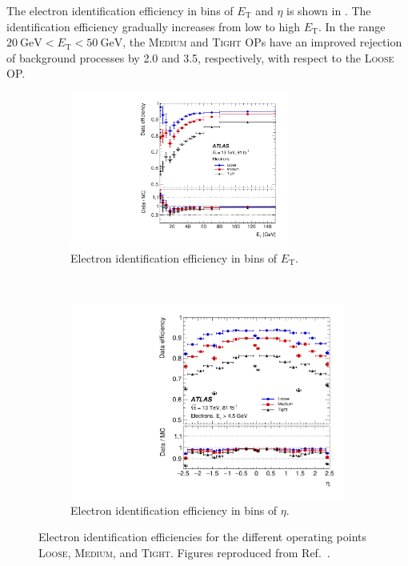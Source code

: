 The electron identification efficiency in bins of \(E_{\text{T}}\) and \(\eta\) is shown in . The identification efficiency gradually increases from low to high \(E_{\text{T}}\). In the range \(\SI{20}{\giga\electronvolt} < E_{\text{T}} < \SI{50}{\giga\electronvolt}\), the \textsc{Medium} and \textsc{Tight} OPs have an improved rejection of background processes by \num{2.0} and \num{3.5}, respectively, with respect to the \textsc{Loose} OP.
\begin{figure}[htbp]
    \centering
    \begin{subfigure}{1.\textwidth}
      \centering
      \includegraphics[width=0.79\textwidth]{figures/methods/electron_id_et.pdf}
      \caption{Electron identification efficiency in bins of \(E_{\text{T}}\).}
      \label{fig:methods:event-reconstruction:electrons:identification:et}
    \end{subfigure}
    \\
    \begin{subfigure}{1.\textwidth}
      \centering
      \includegraphics[width=.79\textwidth]{figures/methods/electron_id_eta.pdf}
      \caption{Electron identification efficiency in bins of \(\eta\).}
      \label{fig:methods:event-reconstruction:electrons:identification:eta}
    \end{subfigure}
    \caption{Electron identification efficiencies for the different operating points \textsc{Loose}, \textsc{Medium}, and \textsc{Tight}. Figures reproduced from Ref.~\cite{EGAM-2018-01}.}
    \label{fig:methods:event-reconstruction:electrons:identification}
\end{figure}

